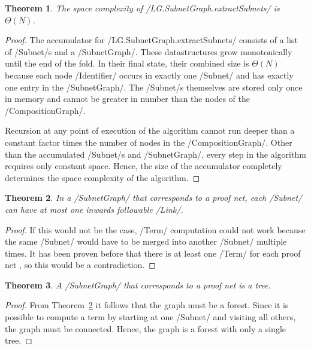 \documentclass[12pt,a4paper]{article}
\newtheorem{theorem}{Theorem}
\begin{document}
\begin{theorem}\label{thm:netgraph-space}
    The space complexity of \hs/LG.SubnetGraph.extractSubnets/ is $\Theta(N)$.
\end{theorem}
\begin{proof}
    The accumulator for \hs/LG.SubnetGraph.extractSubnets/ consists of a list of \hs/Subnet/s and a \hs/SubnetGraph/. These datastructures grow monotonically until the end of the fold. In their final state, their combined size is $\Theta(N)$ because each node \hs/Identifier/ occurs in exactly one \hs/Subnet/ and has exactly one entry in the \hs/SubnetGraph/. The \hs/Subnet/s themselves are stored only once in memory and cannot be greater in number than the nodes of the \hs/CompositionGraph/.
    
    Recursion at any point of execution of the algorithm cannot run deeper than a constant factor times the number of nodes in the \hs/CompositionGraph/. Other than the accumulated \hs/Subnet/s and \hs/SubnetGraph/, every step in the algorithm requires only constant space. Hence, the size of the accumulator completely determines the space complexity of the algorithm.
\end{proof}

\begin{theorem}\label{thm:inwards-links}
    In a \hs/SubnetGraph/ that corresponds to a proof net, each \hs/Subnet/ can have at most one inwards followable \hs/Link/.
\end{theorem}
\begin{proof}
    If this would not be the case, \hs/Term/ computation could not work because the same \hs/Subnet/ would have to be merged into another \hs/Subnet/ multiple times. It has been proven before that there is at least one \hs/Term/ for each proof net \cite[p.~11]{mm12}, so this would be a contradiction.
\end{proof}

\begin{theorem}\label{thm:tree}
    A \hs/SubnetGraph/ that corresponds to a proof net is a tree.
\end{theorem}
\begin{proof}
    From Theorem~\ref{thm:inwards-links} it follows that the graph must be a forest. Since it is possible to compute a term by starting at one \hs/Subnet/ and visiting all others, the graph must be connected. Hence, the graph is a forest with only a single tree.
\end{proof}
\end{document}

